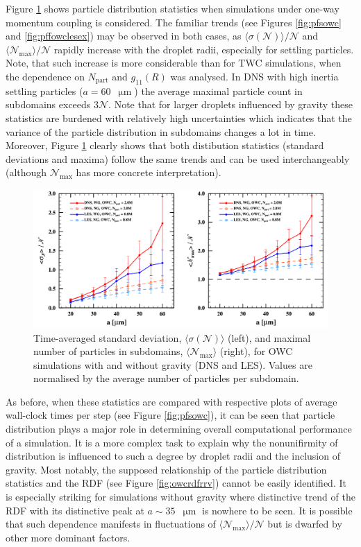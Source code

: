 \documentclass{pracamgren}
\begin{document}
Figure \ref{fig:pfpowc} shows particle distribution statistics when simulations under one-way momentum coupling is considered.
The familiar trends (see Figures \ref{fig:pfsowc} and \ref{fig:pffowclesex}) may be observed in both cases, as $\langle \sigma(\mathcal{N}) \rangle / \mathcal{N}$ and $\langle \mathcal{N}_{\max} \rangle / \mathcal{N}$ rapidly increase with the droplet radii, especially for settling particles.
Note, that such increase is more considerable than for TWC simulations, when the dependence on $N_{\text{part}}$ and $g_{11}(R)$ was analysed.
In DNS with high inertia settling particles (${a = 60}$~$\upmu\text{m}$) the average maximal particle count in subdomains exceeds $3 \mathcal{N}$.
Note that for larger droplets influenced by gravity these statistics are burdened with relatively high uncertainties which indicates that the variance of the particle distribution in subdomains changes a lot in time.
Moreover, Figure \ref{fig:pfpowc} clearly shows that both distibution statistics (standard deviations and maxima) follow the same trends and can be used interchangeably (although $\mathcal{N}_{\max}$ has more concrete interpretation).

\begin{figure}[h]
\centering
\includegraphics[width=13.5cm]{figures/3-17_pfpowc.pdf}
\caption{
Time-averaged standard deviation, $\langle \sigma(\mathcal{N}) \rangle$ (left), and maximal number of particles in subdomains, $\langle \mathcal{N}_{\max} \rangle$ (right), for OWC simulations with and without gravity (DNS and LES).
Values are normalised by the average number of particles per subdomain.
}
\label{fig:pfpowc}
\end{figure}

As before, when these statistics are compared with respective plots of average wall-clock times per step (see Figure \ref{fig:pfsowc}), it can be seen that particle distribution plays a major role in determining overall computational performance of a simulation.
It is a more complex task to explain why the nonunifirmity of distribution is influenced to such a degree by droplet radii and the inclusion of gravity.
Most notably, the supposed relationship of the particle distribution statistics and the RDF (see Figure \ref{fig:owcrdfrrv}) cannot be easily identified.
It is especially striking for simulations without gravity where distinctive trend of the RDF with its distinctive peak at $a \sim 35$~$\upmu\text{m}$ is nowhere to be seen.
It is possible that such dependence manifests in fluctuations of $\langle \mathcal{N}_{\max} \rangle / \mathcal{N}$ but is dwarfed by other more dominant factors.
  
\end{document}
